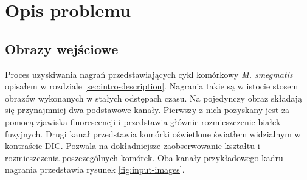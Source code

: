 \documentclass[declaration,shortabstract,mgr]{iithesis}
\begin{document}
\section{Opis problemu}
\label{sec:problem}

\subsection{Obrazy wejściowe}
\label{sec:input-images}

Proces uzyskiwania nagrań przedstawiających cykl komórkowy \emph{M. smegmatis} opisałem w rozdziale \ref{sec:intro-description}.
Nagrania takie są w istocie stosem obrazów wykonanych w stałych odstępach czasu.
Na pojedynczy obraz składają się przynajmniej dwa podstawowe kanały.
Pierwszy z nich pozyskany jest za pomocą zjawiska fluorescencji i przedstawia głównie rozmieszczenie białek fuzyjnych.
Drugi kanał przedstawia komórki oświetlone światłem widzialnym w kontraście DIC.
Pozwala na dokładniejsze zaobserwowanie kształtu i rozmieszczenia poszczególnych komórek.
Oba kanały przykładowego kadru nagrania przedstawia rysunek \ref{fig:input-images}.
\end{document}
